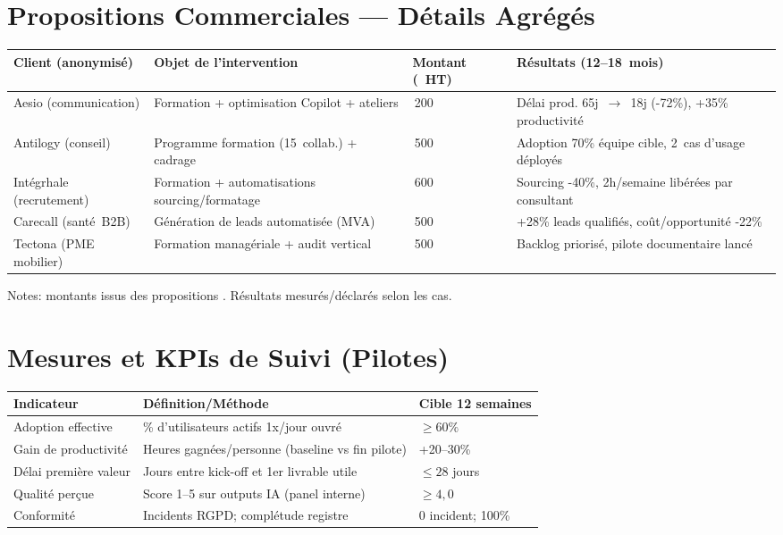 \section{Propositions Commerciales — Détails Agrégés}
\begin{longtable}{@{}>{\raggedright\arraybackslash}p{3.2cm}>{\raggedright\arraybackslash}p{5cm}>{\raggedright\arraybackslash}p{2.5cm}>{\raggedright\arraybackslash}p{4.5cm}@{}}
\toprule
\textbf{Client (anonymisé)} & \textbf{Objet de l'intervention} & \textbf{Montant (\texteuro{}~HT)} & \textbf{Résultats (12–18~mois)} \\
\midrule
Aesio (communication) & Formation + optimisation Copilot + ateliers & 3\,200 & Délai prod. 65j~$\rightarrow$~18j (-72\%), +35\% productivité \\
Antilogy (conseil) & Programme formation (15~collab.) + cadrage & 3\,500 & Adoption 70\% équipe cible, 2~cas d'usage déployés \\
Intégrhale (recrutement) & Formation + automatisations sourcing/formatage & 2\,600 & Sourcing -40\%, 2h/semaine libérées par consultant \\
Carecall (santé~B2B) & Génération de leads automatisée (MVA) & 2\,500 & +28\% leads qualifiés, coût/opportunité -22\% \\
Tectona (PME mobilier) & Formation managériale + audit vertical & 3\,500 & Backlog priorisé, pilote documentaire lancé \\
\bottomrule
\end{longtable}
Notes: montants issus des propositions \cite{luwai2025aesio, luwai2025antilogy, luwai2025integrhale, luwai2025carecall, luwai2025tectona}. Résultats mesurés/déclarés selon les cas.

\section{Mesures et KPIs de Suivi (Pilotes)}
\begin{longtable}{@{}p{5.5cm}p{7.5cm}p{4cm}@{}}
\toprule
\textbf{Indicateur} & \textbf{Définition/Méthode} & \textbf{Cible 12 semaines} \\
\midrule
Adoption effective & \% d'utilisateurs actifs 1x/jour ouvré & \(\geq 60\%\) \\
Gain de productivité & Heures gagnées/personne (baseline vs fin pilote) & +20–30\% \\
Délai première valeur & Jours entre kick-off et 1er livrable utile & \(\leq 28\) jours \\
Qualité perçue & Score 1–5 sur outputs IA (panel interne) & \(\geq 4{,}0\) \\
Conformité & Incidents RGPD; complétude registre & 0 incident; 100\% \\
\bottomrule
\end{longtable}


